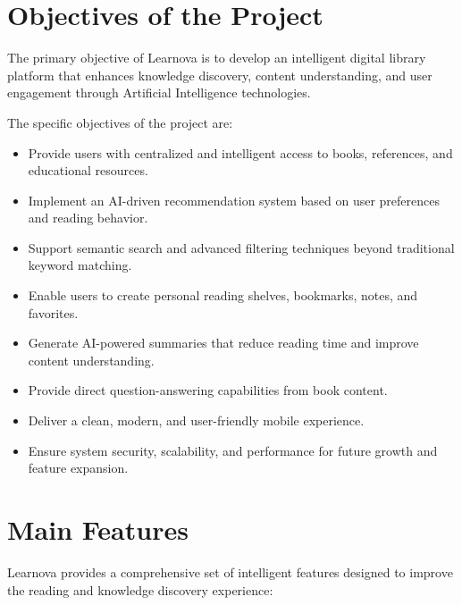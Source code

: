 \section{Objectives of the Project}
\label{sec:objectives}

The primary objective of Learnova is to develop an intelligent digital library
platform that enhances knowledge discovery, content understanding, and user
engagement through Artificial Intelligence technologies.

The specific objectives of the project are:

\begin{itemize}
  \item Provide users with centralized and intelligent access to books,
        references, and educational resources.
  \item Implement an AI-driven recommendation system based on user preferences
        and reading behavior.
  \item Support semantic search and advanced filtering techniques beyond
        traditional keyword matching.
  \item Enable users to create personal reading shelves, bookmarks, notes, and
        favorites.
  \item Generate AI-powered summaries that reduce reading time and improve
        content understanding.
  \item Provide direct question-answering capabilities from book content.
  \item Deliver a clean, modern, and user-friendly mobile experience.
  \item Ensure system security, scalability, and performance for future growth
        and feature expansion.
\end{itemize}

\section{Main Features}
\label{sec:features}

Learnova provides a comprehensive set of intelligent features designed to
improve the reading and knowledge discovery experience:

